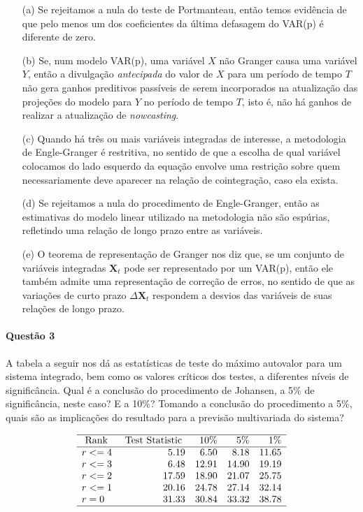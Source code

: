 \documentclass[10pt,a4paper]{article}
\begin{document}
\begin{itemize}
	\item[(a)] Se rejeitamos a nula do teste de Portmanteau, então temos evidência de que pelo menos um dos coeficientes da última defasagem do VAR(p) é diferente de zero.
	\item[(b)] Se, num modelo VAR(p), uma variável $X$ não Granger causa uma variável $Y$, então a divulgação \textit{antecipada} do valor de $X$ para um período de tempo $T$ não gera ganhos preditivos passíveis de serem incorporados na atualização das projeções do modelo para $Y$ no período de tempo $T$, isto é, não há ganhos de realizar a atualização de \textit{nowcasting}.
	\item[(c)] Quando há três ou mais variáveis integradas de interesse, a metodologia de Engle-Granger é restritiva, no sentido de que a escolha de qual variável colocamos do lado esquerdo da equação envolve uma restrição sobre quem necessariamente deve aparecer na relação de cointegração, caso ela exista. 
	\item[(d)] Se rejeitamos a nula do procedimento de Engle-Granger, então as estimativas do modelo linear utilizado na metodologia não são espúrias, refletindo uma relação de longo prazo entre as variáveis.
	\item[(e)] O teorema de representação de Granger nos diz que, se um conjunto de variáveis integradas $\boldsymbol{X}_t$ pode ser representado por um VAR(p), então ele também admite uma representação de correção de erros, no sentido de que as variações de curto prazo $\Delta \boldsymbol{X}_t$ respondem a desvios das variáveis de suas relações de longo prazo.
	
	
\end{itemize}


\paragraph{Questão 3} A tabela a seguir nos dá as estatísticas de teste do máximo autovalor para um sistema integrado, bem como os valores críticos dos testes, a diferentes níveis de significância. Qual é a conclusão do procedimento de Johansen, a 5\% de significância, neste caso? E a 10\%? Tomando a conclusão do procedimento a 5\%, quais são as implicações do resultado para a previsão multivariada do sistema?

$$
\begin{array}{lrrrr}
	\hline \text { Rank } & \text { Test Statistic } & 10 \% & 5 \% & 1 \% \\
	\hline r<=4 & 5.19 & 6.50 & 8.18 & 11.65 \\
	r<=3 & 6.48 & 12.91 & 14.90 & 19.19 \\
	r<=2 & 17.59 & 18.90 & 21.07 & 25.75 \\
	r<=1 & 20.16 & 24.78 & 27.14 & 32.14 \\
	r=0 & 31.33 & 30.84 & 33.32 & 38.78 \\
	\hline
\end{array}
$$
\end{document}
